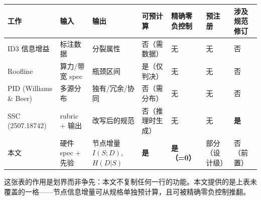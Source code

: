 \documentclass[10pt]{article}
\begin{document}
\begin{longtable}[]{@{}
  >{\raggedright\arraybackslash}p{}
  >{\raggedright\arraybackslash}p{}
  >{\raggedright\arraybackslash}p{}
  >{\raggedright\arraybackslash}p{}
  >{\raggedright\arraybackslash}p{}
  >{\raggedright\arraybackslash}p{}
  >{\raggedright\arraybackslash}p{}@{}}
\toprule\noalign{}
\begin{minipage}[b]{\linewidth}\raggedright
工作
\end{minipage} & \begin{minipage}[b]{\linewidth}\raggedright
输入
\end{minipage} & \begin{minipage}[b]{\linewidth}\raggedright
输出
\end{minipage} & \begin{minipage}[b]{\linewidth}\raggedright
可预计算
\end{minipage} & \begin{minipage}[b]{\linewidth}\raggedright
精确零负控制
\end{minipage} & \begin{minipage}[b]{\linewidth}\raggedright
预注册
\end{minipage} & \begin{minipage}[b]{\linewidth}\raggedright
涉及规范修订
\end{minipage} \\
\midrule\noalign{}
\endhead
\bottomrule\noalign{}
\endlastfoot
ID3 信息增益 & 标注数据 & 分裂属性 & 否（需数据） & 无 & 无 & 否 \\
Roofline \citep{roofline2009} & 算力/带宽 spec & 瓶颈区间 & 是（仅判决） & 无 & 无 & 否 \\
PID (Williams \& Beer) & 多源分布 & 独有/冗余/协同 & 否（需分布） & 无 & 无 & 否 \\
SSC (2507.18742) & rubric + 输出 & 改写后的规范 & 否（推理时生成） & 无 & 无 & \textbf{是} \\
本文 & 硬件 spec + 先验 & 节点增量 $I(S;D)$, $H(D|S)$ & \textbf{是} & \textbf{是（=0）} & 部分（设计级） & 否（前置） \\
\end{longtable}

这张表的作用是划界而非争先：本文不复制任何一行的功能。本文提供的是上表未覆盖的一格——节点信息增量可从规格单独预计算，且可被精确零负控制推翻。
\end{document}
